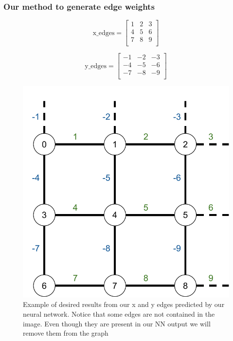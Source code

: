 \subsubsection{Our method to generate edge weights}

\begin{figure}[!htbp]
\centering
\begin{minipage}[c]{0.2\textwidth}
\centering
\[
	\text{x\_edges}=
  \begin{bmatrix}
	  1 & 2 & 3 \\
	  4 & 5 & 6 \\
	  7 & 8 & 9 \\
  \end{bmatrix}
\]
\end{minipage}\hfill
\begin{minipage}[c]{0.2\textwidth}
\centering
\[
	\text{y\_edges}=
  \begin{bmatrix}
	  -1 & -2 & -3 \\
	  -4 & -5 & -6 \\
	  -7 & -8 & -9 \\
  \end{bmatrix}
\]

\end{minipage}\hfill
\begin{minipage}[c]{0.45\textwidth}
\centering
    \includegraphics[width=\textwidth]{./images/edge_weights_predicted.pdf}
\end{minipage}

    \caption{Example of desired results from our x and y edges predicted by our
	neural network. Notice that some edges are not contained in the image. Even
though they are present in our NN output we will remove them from the graph}
    \label{fig:ew_predicted}
\end{figure}

